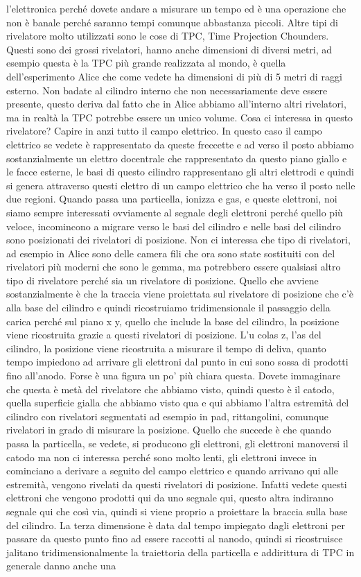 {l'elettronica perché dovete andare a misurare un tempo ed è una operazione che non è banale perché saranno tempi comunque abbastanza piccoli. Altre tipi di rivelatore molto utilizzati sono le cose di TPC, Time Projection Chounders. Questi sono dei grossi rivelatori, hanno anche dimensioni di diversi metri, ad esempio questa è la TPC più grande realizzata al mondo, è quella dell'esperimento Alice che come vedete ha dimensioni di più di 5 metri di raggi esterno. Non badate al cilindro interno che non necessariamente deve essere presente, questo deriva dal fatto che in Alice abbiamo all'interno altri rivelatori, ma in realtà la TPC potrebbe essere un unico volume. Cosa ci interessa in questo rivelatore? Capire in anzi tutto il campo elettrico. In questo caso il campo elettrico se vedete è rappresentato da queste freccette e ad verso il posto abbiamo sostanzialmente un elettro docentrale che rappresentato da questo piano giallo e le facce esterne, le basi di questo cilindro rappresentano gli altri elettrodi e quindi si genera attraverso questi elettro di un campo elettrico che ha verso il posto nelle due regioni. Quando passa una particella, ionizza e gas, e queste elettroni, noi siamo sempre interessati ovviamente al segnale degli elettroni perché quello più veloce, incomincono a migrare verso le basi del cilindro e nelle basi del cilindro sono posizionati dei rivelatori di posizione. Non ci interessa che tipo di rivelatori, ad esempio in Alice sono delle camera fili che ora sono state sostituiti con del rivelatori più moderni che sono le gemma, ma potrebbero essere qualsiasi altro tipo di rivelatore perché sia un rivelatore di posizione. Quello che avviene sostanzialmente è che la traccia viene proiettata sul rivelatore di posizione che c'è alla base del cilindro e quindi ricostruiamo tridimensionale il passaggio della carica perché sul piano x y, quello che include la base del cilindro, la posizione viene ricostruita grazie a questi rivelatori di posizione. L'u colas z, l'as del cilindro, la posizione viene ricostruita a misurare il tempo di deliva, quanto tempo impiedono ad arrivare gli elettroni dal punto in cui sono sossa di prodotti fino all'anodo. Forse è una figura un po' più chiara questa. Dovete immaginare che questa è metà del rivelatore che abbiamo visto, quindi questo è il catodo, quella superficie gialla che abbiamo visto qua e qui abbiamo l'altra estremità del cilindro con rivelatori segmentati ad esempio in pad, rittangolini, comunque rivelatori in grado di misurare la posizione. Quello che succede è che quando passa la particella, se vedete, si producono gli elettroni, gli elettroni manoversi il catodo ma non ci interessa perché sono molto lenti, gli elettroni invece in cominciano a derivare a seguito del campo elettrico e quando arrivano qui alle estremità, vengono rivelati da questi rivelatori di posizione. Infatti vedete questi elettroni che vengono prodotti qui da uno segnale qui, questo altra indiranno segnale qui che così via, quindi si viene proprio a proiettare la braccia sulla base del cilindro. La terza dimensione è data dal tempo impiegato dagli elettroni per passare da questo punto fino ad essere raccotti al nanodo, quindi si ricostruisce jalitano tridimensionalmente la traiettoria della particella e addirittura di TPC in generale danno anche una }
